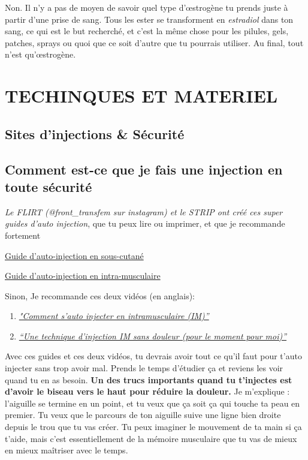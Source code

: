 \documentclass{article}
\begin{document}
Non. Il n'y a pas de moyen de savoir quel type d'œstrogène tu prends juste à partir d'une prise de sang. Tous les ester se transforment en \textit{estradiol} dans ton sang, ce qui est le but recherché, et c'est la même chose pour les pilules, gels, patches, sprays ou quoi que ce soit d'autre que tu pourrais utiliser. Au final, tout n'est qu'œstrogène.


\section{TECHINQUES ET MATERIEL} \label{ts}

\subsection*{Sites d'injections \& Sécurité}

\subsection{Comment est-ce que je fais une injection en toute sécurité}

\textit{Le FLIRT (@front\_transfem sur instagram) et le STRIP ont créé ces super guides d'auto injection}, que tu peux lire ou imprimer, et que je recommande fortement

\href{https://tr.ee/6xXjjsMtPj}{Guide d'auto-injection en sous-cutané}

\href{https://tr.ee/PEeuyOWzvo}{Guide d'auto-injection en intra-musculaire}

Sinon, Je recommande ces deux vidéos (en anglais):

\begin{enumerate}
  \item \href{https://www.youtube.com/watch?v=cBabaGC2Dok}{\textit{"Comment s'auto injecter en intramusculaire (IM)”}}
  \item \href{https://www.youtube.com/watch?v=YfNlAZLxLyw}{\textit{“Une technique d'injection IM sans douleur (pour le moment pour moi)”}}
\end{enumerate}

Avec ces guides et ces deux vidéos, tu devrais avoir tout ce qu'il faut pour t'auto injecter sans trop avoir mal. Prends le temps d'étudier ça et reviens les voir quand tu en as besoin. \textbf{Un des trucs importants quand tu t'injectes est d'avoir le biseau vers le haut pour réduire la douleur.} Je m'explique : l'aiguille se termine en un point, et tu veux que ça soit ça qui touche ta peau en premier. Tu veux que le parcours de ton aiguille suive une ligne bien droite depuis le trou que tu vas créer. Tu peux imaginer le mouvement de ta main si ça t'aide, mais c'est essentiellement de la mémoire musculaire que tu vas de mieux en mieux maîtriser avec le temps.
\end{document}
